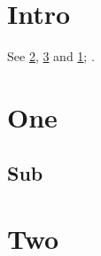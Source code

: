 \documentclass{article}
\begin{document}
\section{Intro}\label{s:intro}
See \cref{a:one}, \cref{a:two} and \cref{s:intro}; .
\begin{appendices}
\section{One}\label{a:one}
\subsection{Sub}\label{a:sub}
\section{Two}\label{a:two}
\end{appendices}
\end{document}
